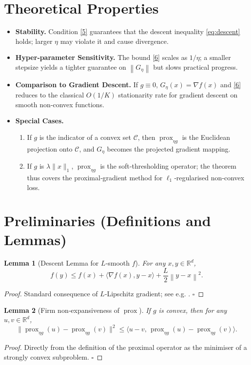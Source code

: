 \documentclass{article}
\newtheorem{lemma}{Lemma}
\newcommand{\prox}{\operatorname{prox}}
\newcommand{\grad}{\nabla}
\newcommand{\R}{\mathbb{R}}
\newcommand{\norm}[1]{\left\|#1\right\|}
\begin{document}
\section*{Theoretical Properties}
\begin{itemize}[leftmargin=*]
\item \textbf{Stability.} Condition \eqref{5} guarantees that the descent inequality \eqref{eq:descent} holds; larger $\eta$ may violate it and cause divergence.
\item \textbf{Hyper‑parameter Sensitivity.} The bound \eqref{6} scales as $1/\eta$; a smaller stepsize yields a tighter guarantee on $\norm{G_{\eta}}$ but slows practical progress.
\item \textbf{Comparison to Gradient Descent.} If $g\equiv0$, $G_{\eta}(x)=\grad f(x)$ and \eqref{6} reduces to the classical $O(1/K)$ stationarity rate for gradient descent on smooth non‑convex functions.
\item \textbf{Special Cases.}
    \begin{enumerate}
        \item If $g$ is the indicator of a convex set $\mathcal C$, then $\prox_{\eta g}$ is the Euclidean projection onto $\mathcal C$, and $G_{\eta}$ becomes the projected gradient mapping.
        \item If $g$ is $\lambda\|x\|_{1}$, $\prox_{\eta g}$ is the soft‑thresholding operator; the theorem thus covers the proximal‑gradient method for $\ell_{1}$‑regularised non‑convex loss.
    \end{enumerate}
\end{itemize}

\section*{Preliminaries (Definitions and Lemmas)}
\begin{lemma}[Descent Lemma for $L$‑smooth $f$]\label{lem:descent}
For any $x,y\in\R^{d}$,
\[
f(y)\le f(x)+\langle\grad f(x),y-x\rangle+\frac{L}{2}\norm{y-x}^{2}.
\tag{7}
\]
\end{lemma}
\begin{proof}
Standard consequence of $L$‑Lipschitz gradient; see e.g. \cite{Nesterov2004}. \hfill $\square$
\end{proof}

\begin{lemma}[Firm non‑expansiveness of $\prox$]\label{lem:firm}
If $g$ is convex, then for any $u,v\in\R^{d}$,
\[
\|\prox_{\eta g}(u)-\prox_{\eta g}(v)\|^{2}
\le \langle u-v,\,\prox_{\eta g}(u)-\prox_{\eta g}(v)\rangle.
\tag{8}
\]
\end{lemma}
\begin{proof}
Directly from the definition of the proximal operator as the minimiser of a strongly convex subproblem. \hfill $\square$
\end{proof}
\end{document}
